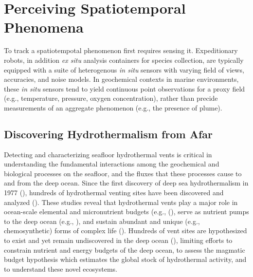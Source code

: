 \chapter{Perceiving Spatiotemporal Phenomena}
To track a spatiotempotal phenomenon first requires sensing it. Expeditionary robots, in addition \emph{ex situ} analysis containers for species collection, are typically equipped with a suite of heterogenous \emph{in situ} sensors with varying field of views, accuracies, and noise models. In geochemical contexts in marine environments, these \emph{in situ} sensors tend to yield continuous point observations for a proxy field (e.g., temperature, pressure, oxygen concentration), rather than precide measurements of an aggregate phenomenon (e.g., the presence of plume). 

\section{Discovering Hydrothermalism from Afar}
Detecting and characterizing seafloor hydrothermal vents is critical in understanding the fundamental interactions among the geochemical and biological processes on the seafloor, and the fluxes that these processes cause to and from the deep ocean. Since the first discovery of deep sea hydrothermalism in 1977 (\cite{corliss1979submarine}), hundreds of hydrothermal venting sites have been discovered and analyzed (\cite{beaulieu2015undiscovered}). These studies reveal that hydrothermal vents play a major role in ocean-scale elemental and micronutrient budgets (e.g., (\cite{le2019hydrothermal,resing2015basin}), serve as nutrient pumps to the deep ocean (e.g., \cite{dick2013microbiology, vic2018dispersion, scholz2019shelf, bell2017hydrothermal}), and sustain abundant and unique (e.g., chemosynthetic) forms of complex life (\cite{grassle1987ecology, georgieva2021history}). Hundreds of vent sites are hypothesized to exist and yet remain undiscovered in the deep ocean (\cite{beaulieu2015undiscovered}), limiting efforts to constrain nutrient and energy budgets of the deep ocean, to assess the magmatic budget hypothesis which estimates the global stock of hydrothermal activity, and to understand these novel ecosystems.  

